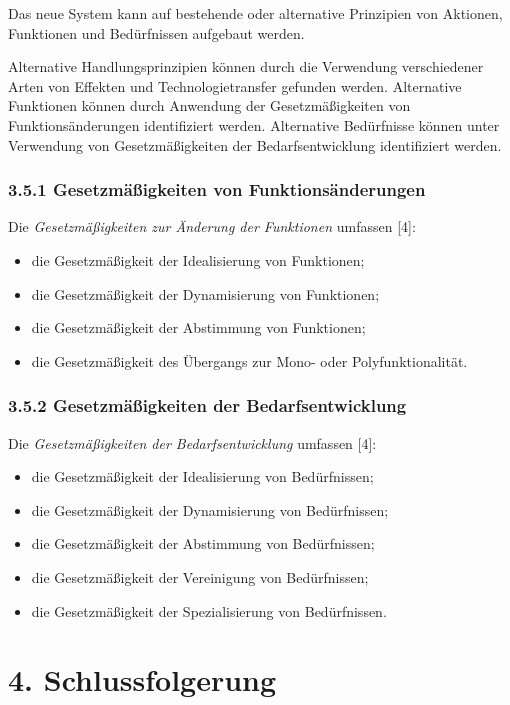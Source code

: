 \documentclass[11pt,a4paper]{article}
\begin{document}
Das neue System kann auf bestehende oder alternative Prinzipien von Aktionen,
Funktionen und Bedürfnissen aufgebaut werden.

Alternative Handlungsprinzipien können durch die Verwendung verschiedener
Arten von Effekten und Technologietransfer gefunden werden. Alternative
Funktionen können durch Anwendung der Gesetzmäßigkeiten von
Funktionsänderungen identifiziert werden. Alternative Bedürfnisse können unter
Verwendung von Gesetzmäßigkeiten der Bedarfsentwicklung identifiziert werden.

\subsubsection{3.5.1 Gesetzmäßigkeiten von Funktionsänderungen}

Die \emph{Gesetzmäßigkeiten zur Änderung der Funktionen} umfassen [4]:
\begin{itemize}
\item die Gesetzmäßigkeit der Idealisierung von Funktionen;
\item die Gesetzmäßigkeit der Dynamisierung von Funktionen;
\item die Gesetzmäßigkeit der Abstimmung von Funktionen;
\item die Gesetzmäßigkeit des Übergangs zur Mono- oder Polyfunktionalität. 
\end{itemize}

\subsubsection{3.5.2 Gesetzmäßigkeiten der Bedarfsentwicklung}
Die \emph{Gesetzmäßigkeiten  der Bedarfsentwicklung} umfassen [4]:
\begin{itemize}
\item die Gesetzmäßigkeit der Idealisierung von Bedürfnissen;
\item die Gesetzmäßigkeit der Dynamisierung von Bedürfnissen;
\item die Gesetzmäßigkeit der Abstimmung von Bedürfnissen;
\item die Gesetzmäßigkeit der Vereinigung von Bedürfnissen;
\item die Gesetzmäßigkeit der Spezialisierung von Bedürfnissen.
\end{itemize}

\section{4. Schlussfolgerung}
\end{document}
